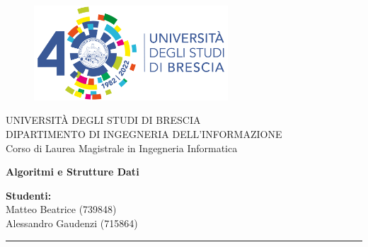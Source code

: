 \begin{titlepage}
    \begin{figure}[H] %
        \centering
        \includegraphics[width=72.4mm]{figures/logo_unibs}
    \end{figure}

    \begin{center}
        \LARGE{\uppercase{Università degli Studi di Brescia}}\\ %
        \vspace{5mm} %
        \large{\uppercase{Dipartimento di Ingegneria dell'Informazione}}\\
        \vspace{5mm}
        \large{Corso di Laurea Magistrale in Ingegneria Informatica}\\
    \end{center}

    \vspace{10mm}

    \begin{center}
        \LARGE{\textbf{Algoritmi e Strutture Dati}}\\
    \end{center}

    \vspace{50mm}

    \begin{flushright}
        \large
        \textbf{Studenti:}\\
        Matteo Beatrice (739848)\\
        Alessandro Gaudenzi (715864)
    \end{flushright}

    \vspace*{\fill} %

    \rule{0.8\textwidth}{0.6pt}\\ %
\end{titlepage}
